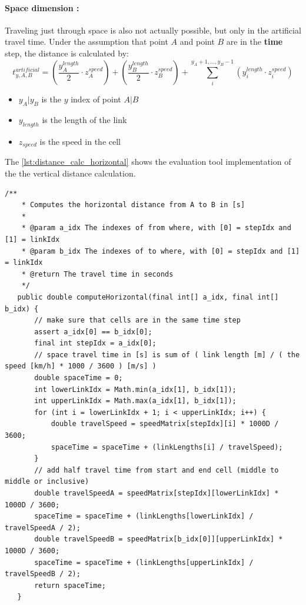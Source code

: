 \paragraph{Space dimension :} Traveling just through space is also not actually possible, but only in the artificial travel time. Under the assumption that point $A$ and point $B$ are in the \textbf{time} step, the distance is calculated by:  
\begin{equation}
	t_{y,A,B}^{artificial} = (\frac{y_{A}^{length}}{2}  \cdot z_{A}^{speed}) + (\frac{y_{B}^{length}}{2} \cdot z_{B}^{speed}) + \sum_{i}^{y_A + 1,...,y_B - 1} (y_{i}^{length} \cdot z_{i}^{speed})
\end{equation}
\begin{itemize}
	\setlength\itemsep{0.1em}	
	\item[] $y_A | y_B$ is the $y$ index of point $A | B$
	\item[] $y_{length}$ is the length of the link
	\item[] $z_{speed}$ is the speed in the cell
\end{itemize}

The \cref{lst:distance_calc_horizontal} shows the evaluation tool implementation of the the vertical distance calculation.
\begin{lstlisting}[basicstyle=\tiny, style=java, caption={Implementation of \textit{horizontal distance calculation}}, label=lst:distance_calc_horizontal] 
	/**
	* Computes the horizontal distance from A to B in [s]
	*
	* @param a_idx The indexes of from where, with [0] = stepIdx and [1] = linkIdx
	* @param b_idx The indexes of to where, with [0] = stepIdx and [1] = linkIdx
	* @return The travel time in seconds
	*/
   public double computeHorizontal(final int[] a_idx, final int[] b_idx) {
	   // make sure that cells are in the same time step
	   assert a_idx[0] == b_idx[0];
	   final int stepIdx = a_idx[0];
	   // space travel time in [s] is sum of ( link length [m] / ( the speed [km/h] * 1000 / 3600 ) [m/s] )
	   double spaceTime = 0;
	   int lowerLinkIdx = Math.min(a_idx[1], b_idx[1]);
	   int upperLinkIdx = Math.max(a_idx[1], b_idx[1]);
	   for (int i = lowerLinkIdx + 1; i < upperLinkIdx; i++) {
		   double travelSpeed = speedMatrix[stepIdx][i] * 1000D / 3600;
		   spaceTime = spaceTime + (linkLengths[i] / travelSpeed);
	   }
	   // add half travel time from start and end cell (middle to middle or inclusive)
	   double travelSpeedA = speedMatrix[stepIdx][lowerLinkIdx] * 1000D / 3600;
	   spaceTime = spaceTime + (linkLengths[lowerLinkIdx] / travelSpeedA / 2);
	   double travelSpeedB = speedMatrix[b_idx[0]][upperLinkIdx] * 1000D / 3600;
	   spaceTime = spaceTime + (linkLengths[upperLinkIdx] / travelSpeedB / 2);
	   return spaceTime;
   }
\end{lstlisting}

